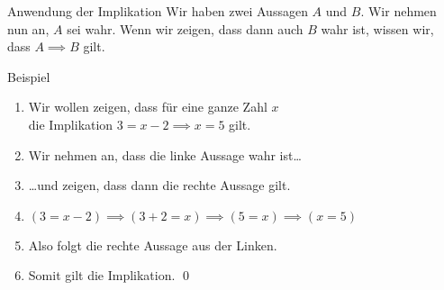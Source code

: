 \begin{frame}{Anwendung der Implikation}
	Wir haben zwei Aussagen $A$ und $B$. Wir nehmen nun an, $A$ sei wahr. Wenn wir zeigen, dass dann auch $B$ wahr ist, wissen wir, dass $A \implies B$ gilt.
	\begin{exampleblock}{Beispiel}
		\begin{enumerate}
			\item<1-> Wir wollen zeigen, dass für eine ganze Zahl $x$ \\
			      die Implikation $3 = x - 2 \implies x = 5$ gilt.
			\item<2-> Wir nehmen an, dass die linke Aussage wahr ist\dots
			\item<3-> \dots und zeigen, dass dann die rechte Aussage gilt.
			\item<4-> $(3 = x - 2) \implies (3 + 2 = x) \implies (5 = x) \implies (x = 5)$
			\item<5-> Also folgt die rechte Aussage aus der Linken.
			\item<6-> Somit gilt die Implikation. \qed\;
		\end{enumerate}
	\end{exampleblock}
\end{frame}
